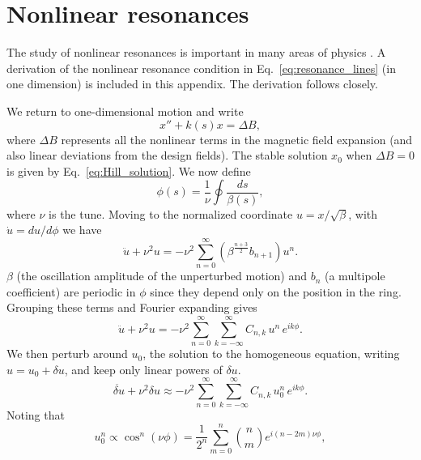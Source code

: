 \chapter{Nonlinear resonances} \label{app-A}

The study of nonlinear resonances is important in many areas of physics \cite{Reichl1992}. A derivation of the nonlinear resonance condition in Eq.~\ref{eq:resonance_lines} (in one dimension) is included in this appendix. The derivation follows \cite{LundLecture1} closely.

We return to one-dimensional motion and write
%
\begin{equation}\label{eq:Hill_nonlinear}
    x'' + k(s) x = \Delta B,
\end{equation}
%
where $\Delta B$ represents all the nonlinear terms in the magnetic field expansion (and also linear deviations from the design fields). The stable solution $x_0$ when $\Delta B = 0$ is given by Eq.~\eqref{eq:Hill_solution}. We now define
%
\begin{equation}
    \phi(s) = \frac{1}{\nu} \oint{\frac{ds}{\beta(s)}},
\end{equation}
%
where $\nu$ is the tune. Moving to the normalized coordinate $u = x / \sqrt{\beta}$, with $\dot{u} = du/d\phi$ we have
%
\begin{equation}\label{eq:pert1}
    \ddot{u} + \nu^2 u = -\nu^2 \sum_{n=0}^{\infty}{\left(\beta^{\frac{n+3}{2}} b_{n+1}\right) u^n}.
\end{equation}
%
$\beta$ (the oscillation amplitude of the unperturbed motion) and $b_n$ (a multipole coefficient) are periodic in $\phi$ since they depend only on the position in the ring. Grouping these terms and Fourier expanding gives
%
\begin{equation}
    \ddot{u} + \nu^2 u = -\nu^2 \sum_{n=0}^{\infty}\sum_{k=-\infty}^{\infty} C_{n,k} \, u^n \, e^{ik\phi}.
\end{equation} 
%
We then perturb around $u_0$, the solution to the homogeneous equation, writing $u = u_0 + \delta u$, and keep only linear powers of $\delta u$. 
%
\begin{equation}
    \ddot{\delta u} + \nu^2 \delta u \approx -\nu^2 \sum_{n=0}^{\infty}\sum_{k=-\infty}^{\infty} C_{n,k} \, u_0^n \, e^{ik\phi}.
\end{equation}
%
Noting that
%
\begin{equation}
    u_0^n \propto \cos^n(\nu\phi) = \frac{1}{2^n}\sum_{m=0}^{n} \binom{n}{m} e^{i(n-2m)\nu\phi},
\end{equation} 
